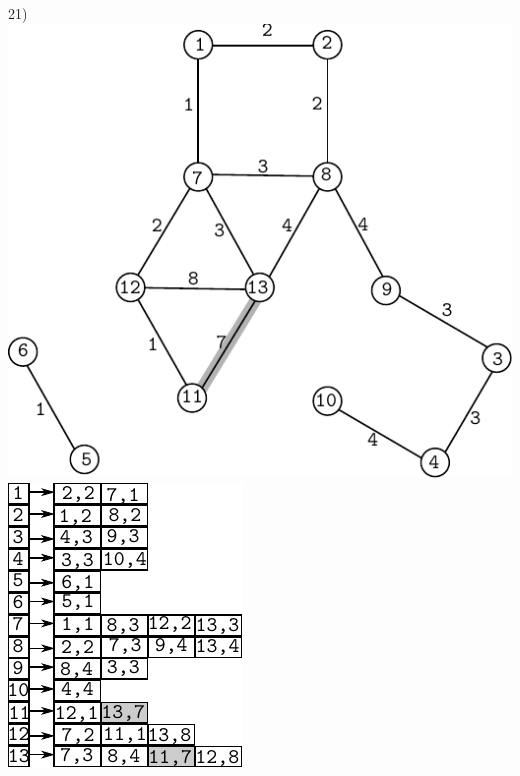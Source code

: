 \documentclass{article}
\begin{document}
\begin{center}
21)\includegraphics[scale=0.6]{bottleneck/g21}
\hspace{5mm}
\includegraphics[scale=0.9]{bottleneck/l21}
\end{center}
\end{document}
